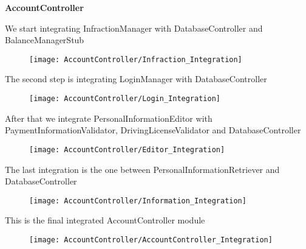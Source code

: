 \begin{Large}
\textbf{AccountController}
\end{Large}

We start integrating InfractionManager with DatabaseController and BalanceManagerStub
\begin{figure}[H]
\texttt{[image: AccountController/Infraction\_Integration]}
\end{figure}

The second step is integrating LoginManager with DatabaseController
\begin{figure}[H]
\texttt{[image: AccountController/Login\_Integration]}
\end{figure}

After that we integrate PersonalInformationEditor with PaymentInformationValidator, DrivingLicenseValidator and DatabaseController
\begin{figure}[H]
\texttt{[image: AccountController/Editor\_Integration]}
\end{figure}

The last integration is the one between PersonalInformationRetriever and DatabaseController
\begin{figure}[H]
\texttt{[image: AccountController/Information\_Integration]}
\end{figure}

This is the final integrated AccountController module
\begin{figure}[H]
\texttt{[image: AccountController/AccountController\_Integration]}
\end{figure}